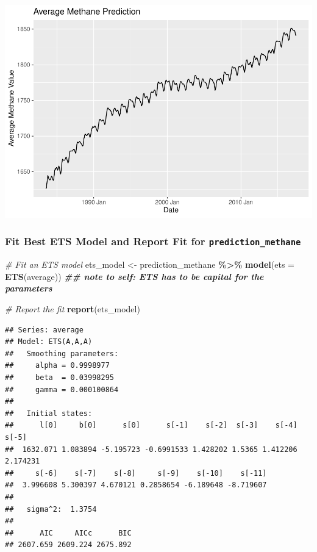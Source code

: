 \documentclass[
]{article}
\newenvironment{Shaded}{\begin{snugshade}}{\end{snugshade}}
\newcommand{\AttributeTok}[1]{\textcolor[rgb]{0.13,0.29,0.53}{#1}}
\newcommand{\CommentTok}[1]{\textcolor[rgb]{0.56,0.35,0.01}{\textit{#1}}}
\newcommand{\DocumentationTok}[1]{\textcolor[rgb]{0.56,0.35,0.01}{\textbf{\textit{#1}}}}
\newcommand{\FunctionTok}[1]{\textcolor[rgb]{0.13,0.29,0.53}{\textbf{#1}}}
\newcommand{\NormalTok}[1]{#1}
\newcommand{\OtherTok}[1]{\textcolor[rgb]{0.56,0.35,0.01}{#1}}
\newcommand{\SpecialCharTok}[1]{\textcolor[rgb]{0.81,0.36,0.00}{\textbf{#1}}}
\begin{document}
\includegraphics{MontgomeryR_Assignment3_files/figure-latex/unnamed-chunk-14-1.pdf}

\hypertarget{fit-best-ets-model-and-report-fit-for-prediction_methane}{%
\subsubsection{\texorpdfstring{Fit Best ETS Model and Report Fit for
\texttt{prediction\_methane}}{Fit Best ETS Model and Report Fit for prediction\_methane}}\label{fit-best-ets-model-and-report-fit-for-prediction_methane}}

\begin{Shaded}
\begin{Highlighting}[]
\CommentTok{\# Fit an ETS model}
\NormalTok{ets\_model }\OtherTok{\textless{}{-}}\NormalTok{ prediction\_methane }\SpecialCharTok{\%\textgreater{}\%} 
  \FunctionTok{model}\NormalTok{(}\AttributeTok{ets =} \FunctionTok{ETS}\NormalTok{(average)) }\DocumentationTok{\#\# note to self: \textquotesingle{}ETS\textquotesingle{} has to be capital for the parameters}

\CommentTok{\# Report the fit}
\FunctionTok{report}\NormalTok{(ets\_model)}
\end{Highlighting}
\end{Shaded}

\begin{verbatim}
## Series: average 
## Model: ETS(A,A,A) 
##   Smoothing parameters:
##     alpha = 0.9998977 
##     beta  = 0.03998295 
##     gamma = 0.000100864 
## 
##   Initial states:
##      l[0]     b[0]      s[0]      s[-1]    s[-2]  s[-3]    s[-4]    s[-5]
##  1632.071 1.083894 -5.195723 -0.6991533 1.428202 1.5365 1.412206 2.174231
##     s[-6]    s[-7]    s[-8]     s[-9]    s[-10]    s[-11]
##  3.996608 5.300397 4.670121 0.2858654 -6.189648 -8.719607
## 
##   sigma^2:  1.3754
## 
##      AIC     AICc      BIC 
## 2607.659 2609.224 2675.892
\end{verbatim}
\end{document}
